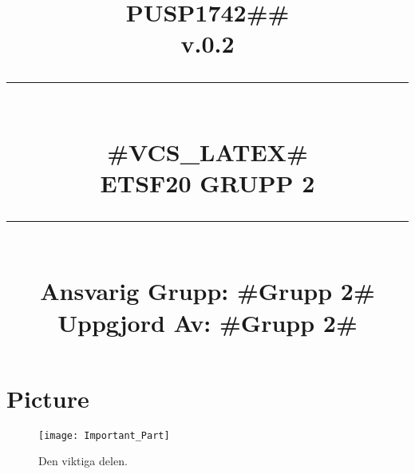 \documentclass[paper=a4, fontsize=11pt,twoside]{article}
\title{
		\documentNumber{#1}																						
		\documentVersion{#2}																				
		\HRule{0.5pt} \\ %
		\LARGE \textbf{\uppercase{#3}} \\
		\large \textbf{\uppercase{ETSF20 Grupp 2}} 
		\HRule{2pt} \\ [1.5cm]    
		\normalsize            
		\documentResponsible{#4} \\ 
		\documentCreator{#4}  
	}
\newcommand{\HRule}[1]{\rule{\linewidth}{#1}}
\newcommand{\documentNumber}[1]{\centering PUSP1742#1 \\[1.0cm]}
\newcommand{\documentVersion}[1]{\centering \small{v.#1} \\[1.0cm]}
\newcommand{\documentResponsible}[1]{\centering  Ansvarig Grupp: #1}
\newcommand{\documentCreator}[1]{\centering Uppgjord Av: #1}
\newcommand{\grouptitlepage}[4]{ 
	\title{
		\documentNumber{#1}																						
		\documentVersion{#2}																				
		\HRule{0.5pt} \\ %
		\LARGE \textbf{\uppercase{#3}} \\
		\large \textbf{\uppercase{ETSF20 Grupp 2}} 
		\HRule{2pt} \\ [1.5cm]    
		\normalsize            
		\documentResponsible{#4} \\ 
		\documentCreator{#4}  
	}																							
	\maketitle																							
	\thispagestyle{empty} 																					
	\newpage 
}
\begin{document}
\grouptitlepage
{\#\#}
{0.2}
{\#VCS\_LaTeX\#}
{\#Grupp 2\#}
\tableofcontents
\section{Picture}
\begin{figure}[H]
\centering
\texttt{[image: Important\_Part]}
\caption{Den viktiga delen.}
\end{figure}
\end{document}
